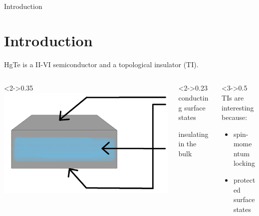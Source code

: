 \begin{frame}{Introduction}\section{Introduction}
		HgTe is a II-VI semiconductor and a topological insulator (TI).
		\vspace{10px}
	\begin{columns} 
		\begin{column}<2->{0.35\linewidth} \centering
			\includegraphics[width=\linewidth]{extrabilder_fuer_vortrag/Introduction1.jpg}
		\end{column}
		\begin{column}<2->{0.23\linewidth} 
			conducting surface states
			
			\vspace{5px}
			insulating in the bulk
			
			\vspace{15pt}
		\end{column}\hfill
		\begin{column}<3->{0.5\linewidth} 
			TIs are interesting because:
			\begin{itemize}
				\item<4-> spin-momentum locking
				\item<5-> protected surface states
			\end{itemize}
		\end{column}\hfill
	\end{columns}
	

\end{frame}
